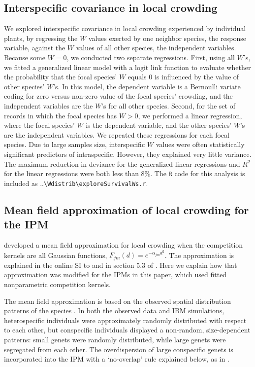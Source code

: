 \documentclass[11pt]{article}
\begin{document}
\subsection{Interspecific covariance in local crowding} 
We explored interspecific covariance in local crowding experienced by individual plants, by regressing the $W$ values exerted by one neighbor species,
 the response variable, against the $W$ values of all other species, the independent variables. Because some $W=0$, we conducted two 
 separate regressions. First, using all $W$'s, we fitted a generalized linear model with a logit link function to evaluate whether the 
 probability that the focal species' $W$ equals 0 is influenced by the value of other species' $W$'s. In this model, the dependent 
 variable is a Bernoulli variate coding for zero versus non-zero value of the focal species' crowding, and the independent 
 variables are the $W$'s for all other species. Second, for the set of records in which the focal species has $W>0$, we 
 performed a linear regression, where the focal species' $W$ is the dependent variable, and the other species' $W$'s are 
 the independent variables. We repeated these regressions for each focal species. Due to large samples size, interspecific $W$ 
 values were often statistically significant predictors of intraspecific. However, they explained very little variance. The 
 maximum reduction in deviance for the generalized linear regressions and $R^2$ for the linear regressions were both less 
 than 8\%. The \texttt{R} code for this analysis is included as ..\texttt{\textbackslash Wdistrib\textbackslash exploreSurvivalWs.r}.

\subsection{Mean field approximation of local crowding for the IPM} 
\label{sec:kernelMethods} 
\citet{adler_coexistence_2010} developed a mean field approximation for local crowding when the
competition kernels are all Gaussian functions, $F_{jm}(d) = e^{-\alpha_{jm} d^2}$. The approximation is explained in 
the online SI to \citet{adler_coexistence_2010} and in section 5.3 of \citet{Ellner2016}. 
Here we explain how that approximation was modified for the IPMs in this paper, which
used fitted nonparametric competition kernels. 

The mean field approximation is based on the observed spatial distribution patterns of the species \citep{adler_coexistence_2010}. 
In both the observed data and IBM simulations, heterospecific individuals were approximately randomly distributed with respect to each other, 
but conspecific individuals displayed a non-random, size-dependent patterns: small genets were randomly distributed, while large genets 
were segregated from each other. The overdispersion of large conspecific genets is incorporated into the IPM 
with a `no-overlap' rule explained below, as in \citep{adler_coexistence_2010}.
\end{document}
